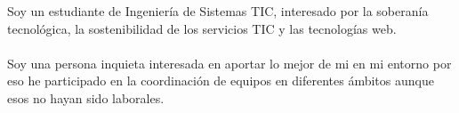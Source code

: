 \documentclass[9pt]{developercv} %
\begin{document}
\vspace{0.5cm}



\begin{minipage}[t]{0.4\textwidth} %
	\vspace{-\baselineskip} %
	
    Soy un estudiante de Ingeniería de Sistemas TIC, interesado por la soberanía tecnológica, la sostenibilidad de los servicios TIC y las tecnologías web.
    \\
    \\
    Soy una persona inquieta interesada en aportar lo mejor de mi en mi entorno por eso he participado en la coordinación de equipos en diferentes ámbitos aunque esos no hayan sido laborales.
\end{minipage}
\hfill %
\begin{minipage}[t]{0.5\textwidth} %
	\vspace{-\baselineskip} %
	\begin{barchart}{5.5}
	\end{barchart}
\end{minipage}


\end{document}

